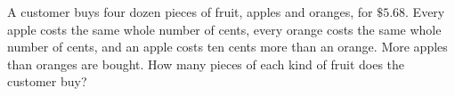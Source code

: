 A customer buys four dozen pieces of fruit, apples and oranges, for $\$5.68$. Every apple costs the same whole number of cents, every orange costs the same whole number of cents, and an apple costs ten cents more than an orange. More apples than oranges are bought. How many pieces of each kind of fruit does the customer buy?
